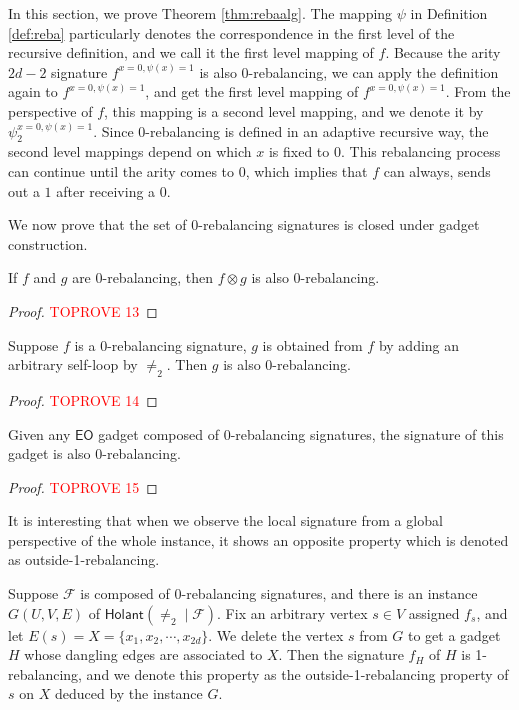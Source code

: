 \documentclass[a4paper,UKenglish,cleveref, autoref, thm-restate]{lipics-v2021}
\newcommand{\hol}[0]{\textsf{Holant}}
\newcommand{\eo}[0]{\textsf{EO}}
\newcommand{\ba}[1][0]{{{#1}-rebalancing}}
\begin{document}
In this section, we prove Theorem \ref{thm:rebaalg}. The mapping $\psi$ in Definition \ref{def:reba} particularly denotes the correspondence in the first level of the recursive definition, and we call it the first level mapping of $f$. 
Because the arity $2d-2$ signature $f^{x=0,\psi(x)=1}$ is also \ba[0], we can apply the definition again to $f^{x=0,\psi(x)=1}$, and get the first level mapping of $f^{x=0,\psi(x)=1}$. From the perspective of $f$, this mapping is a second level mapping, and we denote it by $\psi_2^{x=0,\psi(x)=1}$. 
Since \ba[0] is defined in an adaptive recursive way, the second level mappings depend on which $x$ is fixed to $0$. 
This rebalancing process can continue until the arity comes to 0, which implies that $f$ can always, sends out a $1$ after receiving a $0$. 

We now prove that the set of \ba[0] signatures is closed under gadget construction.

\begin{lemma} \label{lem:ba-tensor-closed}
If $f$ and $g$ are \ba[0], then $f\otimes g$ is also \ba[0].
\end{lemma}

\begin{proof}\textcolor{red}{TOPROVE 13}\end{proof}

\begin{lemma} \label{lem:ba-jumper-closed}
Suppose $f$ is a \ba[0] signature, $g$ is obtained from $f$ by adding an arbitrary self-loop by $\neq_2$. Then $g$ is also \ba[0].
\end{lemma}

\begin{proof}\textcolor{red}{TOPROVE 14}\end{proof}


\begin{lemma}
    Given any $\eo$ gadget composed of \ba[0] signatures, the signature of this gadget is also \ba[0].
    \label{lem:bagad}
\end{lemma}

\begin{proof}\textcolor{red}{TOPROVE 15}\end{proof}



It is interesting that when we observe the local signature from a global perspective of the whole instance, it shows an opposite property which is denoted as outside-\ba[1]. 


\begin{lemma}\label{outside-1-rebalancing}
    Suppose $\mathcal{F}$ is composed of \ba[0] signatures, and there is an instance $G(U,V,E)$ of $\hol(\neq_2\mid\mathcal{F})$. Fix an arbitrary vertex $s\in V$ assigned $f_s$, and let $E(s)=X=\{x_1,x_2, \cdots, x_{2d}\}$. We delete the vertex $s$ from $G$ to get a gadget $H$ whose dangling edges are associated to $X$. Then the signature $f_H$ of $H$ is \ba[1], and we denote this property as the outside-1-rebalancing property of $s$ on $X$ deduced by the instance $G$.
\end{lemma}
\end{document}

